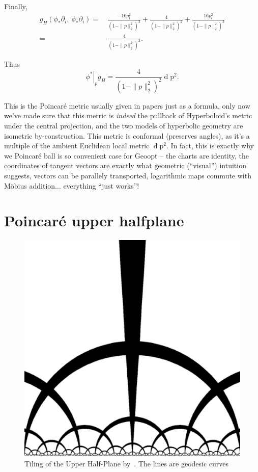Finally,
\begin{align*}
g_H(\phi_*\partial_i,~\phi_*\partial_i)
= &~\frac{-16 p_i^2}{(1 - \|p\|_2^2)^3} 
  + \frac{4}{(1-\|p\|_2^2)^2} 
  + \frac{16p_i^2}{(1 - \|p\|_2^2)^3} \\
= &~\frac{4}{(1 - \|p\|_2^2)^2}.
\end{align*}

Thus
\[ \left.\phi^*\right|_p g_H = \frac{4}{(1 - \|p\|_2^2)^2} \operatorname{d}\mathrm{p}^2. \]

This is the Poincar\'e metric usually given in papers just as a formula, only now
we've made sure that this metric is \emph{indeed} the pullback of Hyperboloid's
metric under the central projection, and the two models of hyperbolic geometry
are isometric by-construction. This metric is conformal (preserves angles), as
it's a multiple of the ambient Euclidean local metric \( \operatorname{d}\mathrm{p}^2
\). In fact, this is exactly why we Poincar\'e ball is so convenient case for Geoopt
-- the charts are identity, the coordinates of tangent vectors are exactly what
geometric (``visual'') intuition suggests, vectors can be parallely transported,
logarithmic maps commute with M\"obius addition... everything ``just works''!

\section{Poincar\'e upper halfplane}

\begin{figure}
    \center
    \includegraphics[width=.8 \linewidth]{art/tiling-uhp.pdf}
    \caption{Tiling of the Upper Half-Plane by~\citet{bulatovConformal}. The lines
    are geodesic curves}
\end{figure}

